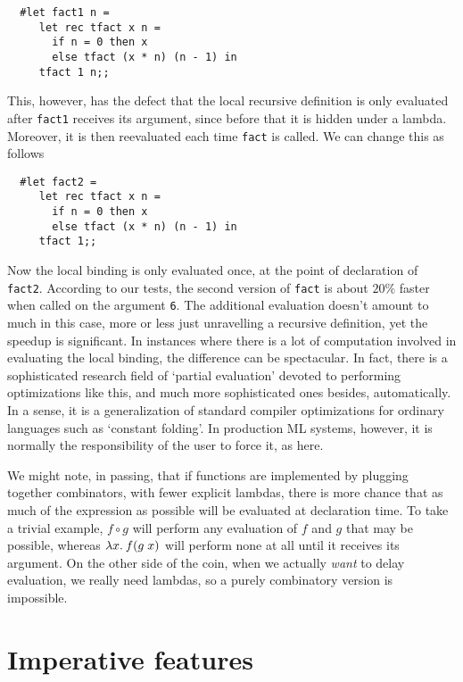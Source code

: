 \begin{boxed}\begin{verbatim}
  #let fact1 n =
     let rec tfact x n =
       if n = 0 then x
       else tfact (x * n) (n - 1) in
     tfact 1 n;;
\end{verbatim}\end{boxed}

This, however, has the defect that the local recursive definition is only
evaluated after {\tt fact1} receives its argument, since before that it is
hidden under a lambda. Moreover, it is then reevaluated each time {\tt fact} is
called. We can change this as follows

\begin{boxed}\begin{verbatim}
  #let fact2 =
     let rec tfact x n =
       if n = 0 then x
       else tfact (x * n) (n - 1) in
     tfact 1;;
\end{verbatim}\end{boxed}

Now the local binding is only evaluated once, at the point of declaration of
{\tt fact2}. According to our tests, the second version of {\tt fact} is about
$20 \%$ faster when called on the argument {\tt 6}. The additional evaluation
doesn't amount to much in this case, more or less just unravelling a recursive
definition, yet the speedup is significant. In instances where there is a lot
of computation involved in evaluating the local binding, the difference can be
spectacular. In fact, there is a sophisticated research field of `partial
evaluation' devoted to performing optimizations like this, and much more
sophisticated ones besides, automatically. In a sense, it is a generalization
of standard compiler optimizations for ordinary languages such as `constant
folding'. In production ML systems, however, it is normally the responsibility
of the user to force it, as here.

We might note, in passing, that if functions are implemented by plugging
together combinators, with fewer explicit lambdas, there is more chance that as
much of the expression as possible will be evaluated at declaration time. To
take a trivial example, $f \circ g$ will perform any evaluation of $f$ and $g$
that may be possible, whereas $\lambda x.\: f(g\; x)$ will perform none at all
until it receives its argument. On the other side of the coin, when we actually
{\em want} to delay evaluation, we really need lambdas, so a purely combinatory
version is impossible.

\section{Imperative features}

